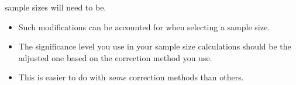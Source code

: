 \begin{itemize}
            sample sizes will need to be.
            \begin{itemize}
                  \item Such modifications can be accounted for when selecting a sample size.
                  \item The significance level you use in your sample size calculations should be the adjusted one based
                        on the correction method you use.
                  \item This is easier to do with \emph{some} correction methods than others.
            \end{itemize}
\end{itemize}
